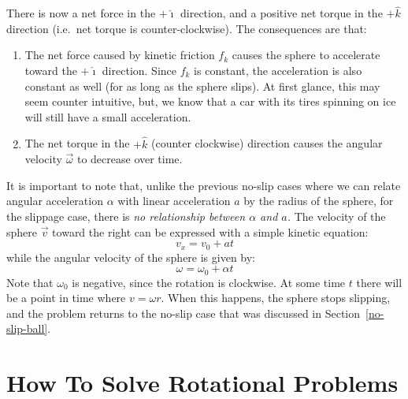\documentclass{../../oss-handout}
\newcommand{\iii}{\hat\imath}
\newcommand{\kkk}{\hat k}
\begin{document}
There is now a net force in the $+\iii$ direction, and a positive net torque in
the $+\kkk$ direction (i.e.\ net torque is counter-clockwise). The consequences
are that:
\begin{enumerate}[topsep=0pt]
\item The net force caused by kinetic friction $f_k$ causes the sphere to
  accelerate toward the $+\iii$ direction. Since $f_k$ is constant, the
  acceleration is also constant as well (for as long as the sphere slips). At
  first glance, this may seem counter intuitive, but, we know that a car with
  its tires spinning on ice will still have a small acceleration.
\item The net torque in the $+\kkk$ (counter clockwise) direction
  causes the angular velocity $\vec\omega$ to decrease over time.
\end{enumerate}
It is important to note that, unlike the previous no-slip cases where we can 
relate angular acceleration $\alpha$ with linear acceleration $a$ by the radius
of the sphere, for the slippage case, there is \emph{no relationship between
  $\alpha$ and $a$.} The velocity of the sphere $\vec v$ toward the right can
be expressed with a simple kinetic equation:
\begin{equation}
  v_x=v_0+at
\end{equation}
while the angular velocity of the sphere is given by:
\begin{equation}
  \omega=\omega_0+\alpha t
\end{equation}
Note that $\omega_0$ is negative, since the rotation is clockwise. At some time
$t$ there will be a point in time where $v=\omega r$. When this happens, the
sphere stops slipping, and the problem returns to the no-slip case that was
discussed in Section~\ref{no-slip-ball}.

\section{How To Solve Rotational Problems}
\end{document}
